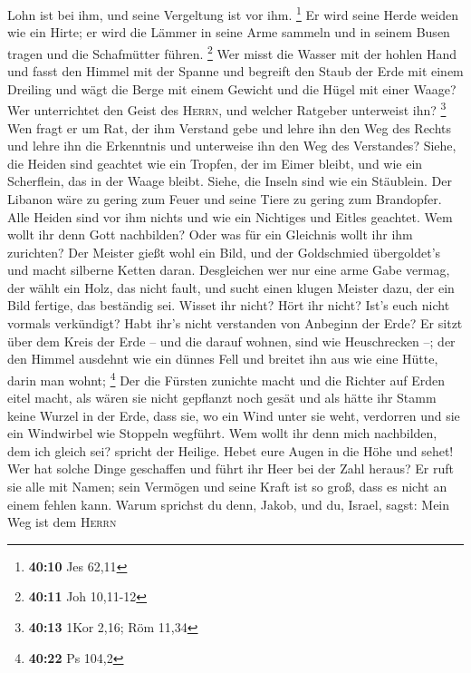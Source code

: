 Lohn ist bei ihm, und seine Vergeltung ist vor ihm. \footnote{\textbf{40:10}
  Jes 62,11}  Er wird seine Herde weiden wie ein Hirte;
er wird die Lämmer in seine Arme sammeln und in seinem Busen tragen und
die Schafmütter führen. \footnote{\textbf{40:11} Joh 10,11-12}
 Wer misst die Wasser mit der hohlen Hand und fasst den
Himmel mit der Spanne und begreift den Staub der Erde mit einem Dreiling
und wägt die Berge mit einem Gewicht und die Hügel mit einer Waage?
 Wer unterrichtet den Geist des \textsc{Herrn}, und
welcher Ratgeber unterweist ihn? \footnote{\textbf{40:13} 1Kor 2,16; Röm
  11,34}  Wen fragt er um Rat, der ihm Verstand gebe und
lehre ihn den Weg des Rechts und lehre ihn die Erkenntnis und unterweise
ihn den Weg des Verstandes?  Siehe, die Heiden sind
geachtet wie ein Tropfen, der im Eimer bleibt, und wie ein Scherflein,
das in der Waage bleibt. Siehe, die Inseln sind wie ein Stäublein.
 Der Libanon wäre zu gering zum Feuer und seine Tiere zu
gering zum Brandopfer.  Alle Heiden sind vor ihm nichts
und wie ein Nichtiges und Eitles geachtet.  Wem wollt ihr
denn Gott nachbilden? Oder was für ein Gleichnis wollt ihr ihm
zurichten?  Der Meister gießt wohl ein Bild, und der
Goldschmied übergoldet's und macht silberne Ketten daran.
 Desgleichen wer nur eine arme Gabe vermag, der wählt ein
Holz, das nicht fault, und sucht einen klugen Meister dazu, der ein Bild
fertige, das beständig sei.  Wisset ihr nicht? Hört ihr
nicht? Ist's euch nicht vormals verkündigt? Habt ihr's nicht verstanden
von Anbeginn der Erde?  Er sitzt über dem Kreis der Erde
-- und die darauf wohnen, sind wie Heuschrecken --; der den Himmel
ausdehnt wie ein dünnes Fell und breitet ihn aus wie eine Hütte, darin
man wohnt; \footnote{\textbf{40:22} Ps 104,2}  Der die
Fürsten zunichte macht und die Richter auf Erden eitel macht,
 als wären sie nicht gepflanzt noch gesät und als hätte
ihr Stamm keine Wurzel in der Erde, dass sie, wo ein Wind unter sie
weht, verdorren und sie ein Windwirbel wie Stoppeln wegführt.
 Wem wollt ihr denn mich nachbilden, dem ich gleich sei?
spricht der Heilige.  Hebet eure Augen in die Höhe und
sehet! Wer hat solche Dinge geschaffen und führt ihr Heer bei der Zahl
heraus? Er ruft sie alle mit Namen; sein Vermögen und seine Kraft ist so
groß, dass es nicht an einem fehlen kann.  Warum sprichst
du denn, Jakob, und du, Israel, sagst: Mein Weg ist dem \textsc{Herrn}
